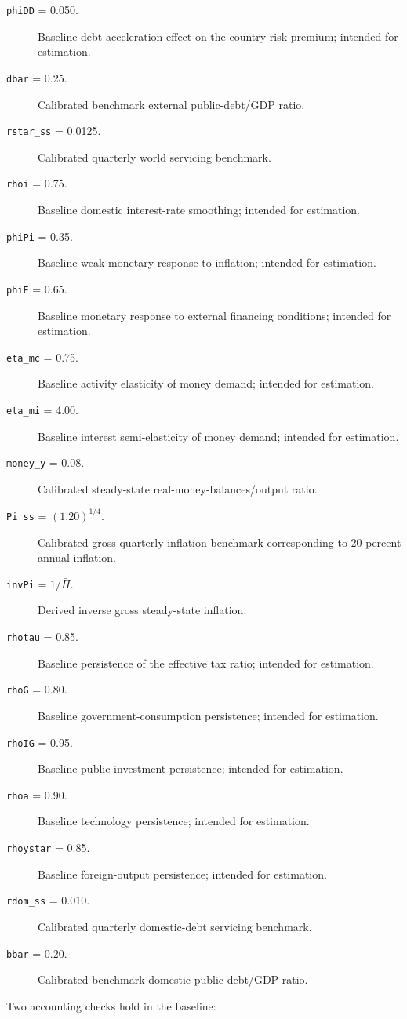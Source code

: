 \begin{description}
\item[\texttt{phiDD} = 0.050.] Baseline debt-acceleration effect on the country-risk premium; intended for estimation.
\item[\texttt{dbar} = 0.25.] Calibrated benchmark external public-debt/GDP ratio.
\item[\texttt{rstar\_ss} = 0.0125.] Calibrated quarterly world servicing benchmark.
\item[\texttt{rhoi} = 0.75.] Baseline domestic interest-rate smoothing; intended for estimation.
\item[\texttt{phiPi} = 0.35.] Baseline weak monetary response to inflation; intended for estimation.
\item[\texttt{phiE} = 0.65.] Baseline monetary response to external financing conditions; intended for estimation.
\item[\texttt{eta\_mc} = 0.75.] Baseline activity elasticity of money demand; intended for estimation.
\item[\texttt{eta\_mi} = 4.00.] Baseline interest semi-elasticity of money demand; intended for estimation.
\item[\texttt{money\_y} = 0.08.] Calibrated steady-state real-money-balances/output ratio.
\item[\texttt{Pi\_ss} = \((1.20)^{1/4}\).] Calibrated gross quarterly inflation benchmark corresponding to 20 percent annual inflation.
\item[\texttt{invPi} = \(1/\bar\Pi\).] Derived inverse gross steady-state inflation.
\item[\texttt{rhotau} = 0.85.] Baseline persistence of the effective tax ratio; intended for estimation.
\item[\texttt{rhoG} = 0.80.] Baseline government-consumption persistence; intended for estimation.
\item[\texttt{rhoIG} = 0.95.] Baseline public-investment persistence; intended for estimation.
\item[\texttt{rhoa} = 0.90.] Baseline technology persistence; intended for estimation.
\item[\texttt{rhoystar} = 0.85.] Baseline foreign-output persistence; intended for estimation.
\item[\texttt{rdom\_ss} = 0.010.] Calibrated quarterly domestic-debt servicing benchmark.
\item[\texttt{bbar} = 0.20.] Calibrated benchmark domestic public-debt/GDP ratio.
\end{description}

Two accounting checks hold in the baseline:


